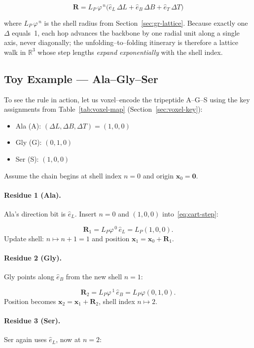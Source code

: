\documentclass[11pt]{article}
\newcommand{\phiGR}{\varphi}                 %
\newcommand{\LP}{L_{\!P}}                    %
\begin{document}
\[
\boxed{\;
\mathbf R
=
\LP\,\phiGR^{\,n}\!
\bigl(
      \hat e_{L}\,\Delta L
      +
      \hat e_{B}\,\Delta B
      +
      \hat e_{T}\,\Delta T
\bigr)
\;}
\tag{16}\label{eq:cart-step}
\]

where $\LP\,\phiGR^{\,n}$ is the shell radius from
Section~\ref{sec:gr-lattice}.  Because exactly one $\Delta$ equals~1,
each hop advances the backbone by one radial unit along a single axis,
never diagonally; the unfolding–to–folding itinerary is therefore a
lattice walk in $\mathbb R^{3}$ whose step lengths \emph{expand
exponentially} with the shell index.

\subsection*{Toy Example — Ala–Gly–Ser}

To see the rule in action, let us voxel–encode the tripeptide
A–G–S using the key assignments from
Table~\ref{tab:voxel-map} (Section~\ref{sec:voxel-key}):

\begin{itemize}
\item Ala (A): $(\Delta L,\Delta B,\Delta T)=(1,0,0)$
\item Gly (G): $(0,1,0)$
\item Ser (S): $(1,0,0)$
\end{itemize}

Assume the chain begins at shell index $n=0$ and origin
$\mathbf x_{0}=\mathbf 0$.

\paragraph{Residue 1 (Ala).}
Ala’s direction bit is $\hat e_{L}$.  
Insert $n=0$ and $(1,0,0)$ into~\eqref{eq:cart-step}:

\[
\mathbf R_{1}
=
\LP\phiGR^{\,0}\,\hat e_{L}
=
\LP(1,0,0).
\]
Update shell: $n\mapsto n+1=1$ and position
$\mathbf x_{1}=\mathbf x_{0}+\mathbf R_{1}$.

\paragraph{Residue 2 (Gly).}
Gly points along $\hat e_{B}$ from the new shell $n=1$:

\[
\mathbf R_{2}
=
\LP\phiGR^{\,1}\,\hat e_{B}
=
\LP\phiGR(0,1,0).
\]
Position becomes
$\mathbf x_{2}=\mathbf x_{1}+\mathbf R_{2}$,
shell index $n\mapsto2$.

\paragraph{Residue 3 (Ser).}
Ser again uses $\hat e_{L}$, now at $n=2$:
\end{document}
